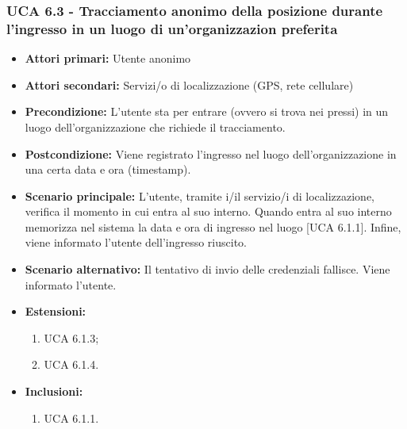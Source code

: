 \subsubsection{UCA 6.3 - Tracciamento anonimo della posizione durante l'ingresso in un luogo di un'organizzazion preferita}
\begin{itemize}
	\item \textbf{Attori primari:} Utente anonimo
	\item \textbf{Attori secondari:} Servizi/o di localizzazione (GPS, rete cellulare)
	\item \textbf{Precondizione:} L'utente sta per entrare (ovvero si trova nei pressi) in un luogo dell'organizzazione che richiede il tracciamento.
	\item \textbf{Postcondizione:} Viene registrato l'ingresso nel luogo dell'organizzazione in una certa data e ora (timestamp).
	\item \textbf{Scenario principale:} L'utente, tramite i/il servizio/i di localizzazione, verifica il momento in cui entra al suo interno. Quando entra al suo interno memorizza nel sistema la data e ora di ingresso nel luogo [UCA 6.1.1]. Infine, viene informato l'utente dell'ingresso riuscito.
	\item \textbf{Scenario alternativo:} Il tentativo di invio delle credenziali fallisce. Viene informato l'utente.
	\item \textbf{Estensioni:}
	\begin{enumerate}
		\item UCA 6.1.3;
		\item UCA 6.1.4.
	\end{enumerate}
	\item \textbf{Inclusioni:}
	\begin{enumerate}
		\item UCA 6.1.1.
	\end{enumerate}
\end{itemize}

